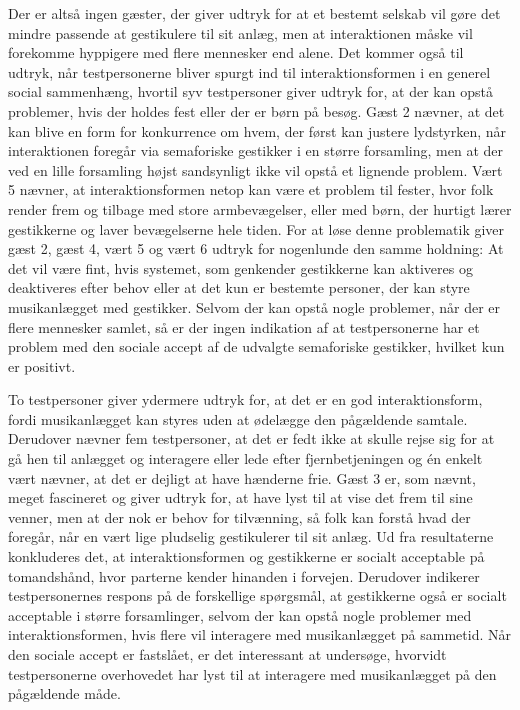 Der er altså ingen gæster, der giver udtryk for at et bestemt selskab vil gøre det mindre passende at gestikulere til sit anlæg, men at interaktionen måske vil forekomme hyppigere med flere mennesker end alene. Det kommer også til udtryk, når testpersonerne bliver spurgt ind til interaktionsformen i en generel social sammenhæng, hvortil syv testpersoner giver udtryk for, at der kan opstå problemer, hvis der holdes fest eller der er børn på besøg. Gæst 2 nævner, at det kan blive en form for konkurrence om hvem, der først kan justere lydstyrken, når interaktionen foregår via semaforiske gestikker i en større forsamling, men at der ved en lille forsamling højst sandsynligt ikke vil opstå et lignende problem. Vært 5 nævner, at interaktionsformen netop kan være et problem til fester, hvor folk render frem og tilbage med store armbevægelser, eller med børn, der hurtigt lærer gestikkerne og laver bevægelserne hele tiden. For at løse denne problematik giver gæst 2, gæst 4, vært 5 og vært 6 udtryk for nogenlunde den samme holdning: At det vil være fint, hvis systemet, som genkender gestikkerne kan aktiveres og deaktiveres efter behov eller at det kun er bestemte personer, der kan styre musikanlægget med gestikker. Selvom der kan opstå nogle problemer, når der er flere mennesker samlet, så er der ingen indikation af at testpersonerne har et problem med den sociale accept af de udvalgte semaforiske gestikker, hvilket kun er positivt. 

To testpersoner giver ydermere udtryk for, at det er en god interaktionsform, fordi musikanlægget kan styres uden at ødelægge den pågældende samtale. Derudover nævner fem testpersoner, at det er fedt ikke at skulle rejse sig for at gå hen til anlægget og interagere eller lede efter fjernbetjeningen og én enkelt vært nævner, at det er dejligt at have hænderne frie. Gæst 3 er, som nævnt, meget fascineret og giver udtryk for, at have lyst til at vise det frem til sine venner, men at der nok er behov for tilvænning, så folk kan forstå hvad der foregår, når en vært lige pludselig gestikulerer til sit anlæg. \blankline
%
Ud fra resultaterne konkluderes det, at interaktionsformen og gestikkerne er socialt acceptable på tomandshånd, hvor parterne kender hinanden i forvejen. Derudover indikerer testpersonernes respons på de forskellige spørgsmål, at gestikkerne også er socialt acceptable i større forsamlinger, selvom der kan opstå nogle problemer med interaktionsformen, hvis flere vil interagere med musikanlægget på sammetid. Når den sociale accept er fastslået, er det interessant at undersøge, hvorvidt testpersonerne overhovedet har lyst til at interagere med musikanlægget på den pågældende måde. 

